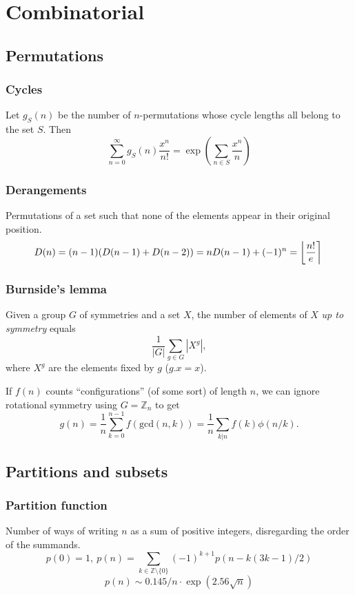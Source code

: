 \chapter{Combinatorial}

\section{Permutations}  
	\subsection{Cycles}
		Let $g_S(n)$ be the number of $n$-permutations whose cycle lengths all belong to the set $S$. Then
		$$\sum_{n=0} ^\infty g_S(n) \frac{x^n}{n!} = \exp\left(\sum_{n\in S} \frac{x^n} {n} \right)$$

	\subsection{Derangements}
		Permutations of a set such that none of the elements appear in their original position.
		\[ \mkern-2mu D(n) = (n-1)(D(n-1)+D(n-2)) = n D(n-1)+(-1)^n = \left\lfloor\frac{n!}{e}\right\rceil \]

	\subsection{Burnside's lemma}
		Given a group $G$ of symmetries and a set $X$, the number of elements of $X$ \emph{up to symmetry} equals
		 \[ {\frac {1}{|G|}}\sum _{{g\in G}}|X^{g}|, \]
		 where $X^{g}$ are the elements fixed by $g$ ($g.x = x$).

		 If $f(n)$ counts ``configurations'' (of some sort) of length $n$, we can ignore rotational symmetry using $G = \mathbb Z_n$ to get
		 \[ g(n) = \frac 1 n \sum_{k=0}^{n-1}{f(\text{gcd}(n, k))} = \frac 1 n \sum_{k|n}{f(k)\phi(n/k)}. \]

\section{Partitions and subsets}
	\subsection{Partition function}
		Number of ways of writing $n$ as a sum of positive integers, disregarding the order of the summands.
		\[ p(0) = 1,\ p(n) = \sum_{k \in \mathbb Z \setminus \{0\}}{(-1)^{k+1} p(n - k(3k-1) / 2)} \]
		\[ p(n) \sim 0.145 / n \cdot \exp(2.56 \sqrt{n}) \]

